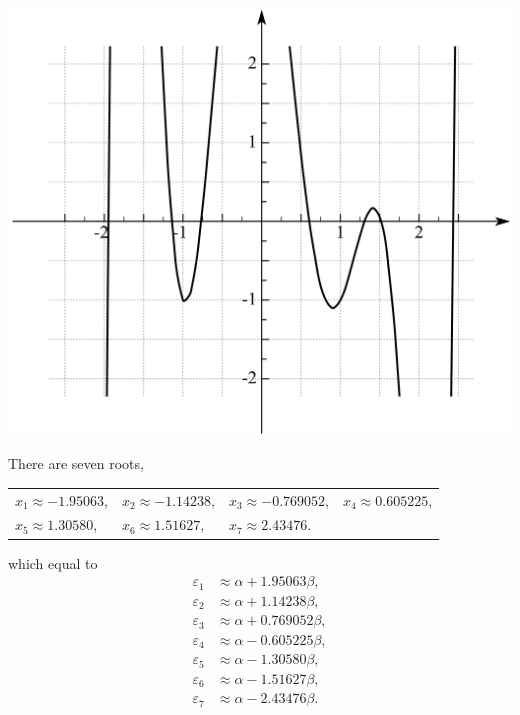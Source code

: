 \documentclass[a4paper]{book}
\begin{document}
\begin{solution}
\begin{enumerate}[label=(\alph*)]
		\begin{center}
		\includegraphics[scale=1]{./structures/exercise_1/phenanthrene/997.png}
		\end{center}				
		There are seven roots,
		\begin{center}
		\begin{tabular}{llll}
			$x_1 \approx -1.95063$, & $x_2 \approx -1.14238$, & $x_3 \approx -0.769052$, & $x_4 \approx 0.605225 $, \\
			$x_5 \approx 1.30580$, & $x_6\approx 1.51627$, & $x_7 \approx 2.43476$. &
		\end{tabular}
		\end{center}
		which equal to	
		\begin{align}
			\varepsilon_1 &\approx \alpha + 1.95063 \beta , \\
			\varepsilon_2 &\approx \alpha + 1.14238 \beta , \\
			\varepsilon_3 &\approx \alpha + 0.769052 \beta , \\
			\varepsilon_4 &\approx \alpha - 0.605225 \beta , \\
			\varepsilon_5 &\approx \alpha - 1.30580 \beta , \\
			\varepsilon_6 &\approx \alpha - 1.51627 \beta , \\
			\varepsilon_7 &\approx \alpha - 2.43476 \beta .
		\end{align}
		

\end{enumerate}
\end{solution}
\end{document}
